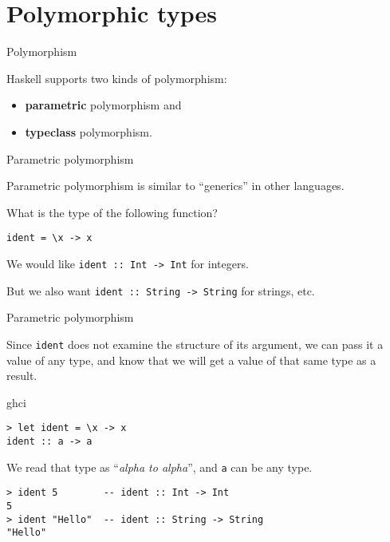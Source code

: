 
\section{Polymorphic types}

%
\begin{frame}[fragile]{Polymorphism}

Haskell supports two kinds of polymorphism:

\begin{itemize}
  \item \textbf{parametric} polymorphism and
  \item \textbf{typeclass} polymorphism.
\end{itemize}

\end{frame}

%
\begin{frame}[fragile]{Parametric polymorphism}

Parametric polymorphism is similar to ``generics'' in other languages.

What is the type of the following function?

\begin{block}{}
\begin{verbatim}
ident = \x -> x
\end{verbatim}
\end{block}

We would like \texttt{ident :: Int -> Int} for integers.

But we also want \texttt{ident :: String -> String} for strings, etc.

\end{frame}

%
\begin{frame}[fragile]{Parametric polymorphism}

Since \texttt{ident} does not examine the structure of its argument, we can
pass it a value of any type, and know that we will get a value of that same type
as a result.

\begin{block}{ghci}
\begin{verbatim}
> let ident = \x -> x
ident :: a -> a
\end{verbatim}
\end{block}

We read that type as ``\emph{alpha to alpha}'', and \texttt{a} can be any type.

\begin{block}{}
\begin{verbatim}
> ident 5        -- ident :: Int -> Int
5
> ident "Hello"  -- ident :: String -> String
"Hello"
\end{verbatim}
\end{block}

\end{frame}

